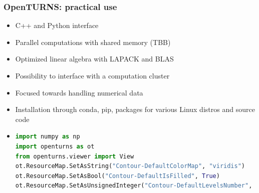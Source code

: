 \documentclass{beamer}
\begin{document}

\begin{frame}[containsverbatim]
  \frametitle{OpenTURNS: practical use}
  
  \small
  \begin{itemize}
  \item C++ and Python interface
  \vspace{10pt}
  \item Parallel computations with shared memory (TBB)
  \vspace{10pt}
  \item Optimized linear algebra with LAPACK and BLAS 
  \vspace{10pt}
  \item Possibility to interface with a computation cluster
  \vspace{10pt}
  \item Focused towards handling numerical data
  \vspace{10pt}
  \item Installation through conda, pip, packages for various Linux distros and source code
  \item 
  \begin{lstlisting}[language=Python, numbers = none]
import numpy as np
import openturns as ot
from openturns.viewer import View
ot.ResourceMap.SetAsString("Contour-DefaultColorMap", "viridis")
ot.ResourceMap.SetAsBool("Contour-DefaultIsFilled", True)
ot.ResourceMap.SetAsUnsignedInteger("Contour-DefaultLevelsNumber", 15)
\end{lstlisting}
  \end{itemize}


\end{frame}
  

\end{document}
